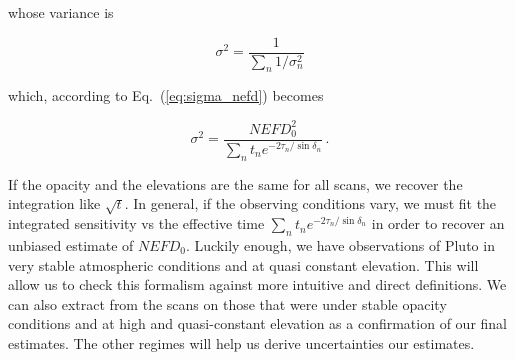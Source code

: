 whose variance is

\begin{equation}
\sigma^2 = \frac{1}{\sum_n 1/\sigma_n^2}
\end{equation}

which, according to Eq.~(\ref{eq:sigma_nefd}) becomes

\begin{equation}
\sigma^2 = \frac{NEFD_0^2}{\sum_{n}t_n e^{-2\tau_n/\sin\delta_n}}\,.
\label{eq:sigma_tau_w8}
\end{equation}

If the opacity and the elevations are the same for all scans, we recover the
integration like $\sqrt{t}$. In general, if the observing conditions vary, we
must fit the integrated sensitivity vs the effective time $\sum_{n}t_n
e^{-2\tau_n/\sin\delta_n}$ in order to recover an unbiased estimate of
$NEFD_0$. Luckily enough, we have observations of Pluto in very stable
atmospheric conditions and at quasi constant elevation. This will allow us to
check this formalism against more intuitive and direct definitions. We can also
extract from the scans on \hls those that were under stable opacity conditions
and at high and quasi-constant elevation as a confirmation of our final
estimates. The other regimes will help us derive uncertainties our estimates.



